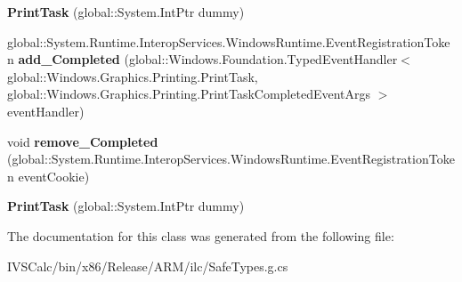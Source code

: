 \begin{DoxyCompactItemize}
\item 
\mbox{\label{class_windows_1_1_graphics_1_1_printing_1_1_print_task_a96a4278842a221de2a49e30404b19e84}} 
{\bfseries Print\+Task} (global\+::\+System.\+Int\+Ptr dummy)
\item 
\mbox{\label{class_windows_1_1_graphics_1_1_printing_1_1_print_task_a017b8b87861dd7ab498c21ff1123c0fe}} 
global\+::\+System.\+Runtime.\+Interop\+Services.\+Windows\+Runtime.\+Event\+Registration\+Token {\bfseries add\+\_\+\+Completed} (global\+::\+Windows.\+Foundation.\+Typed\+Event\+Handler$<$ global\+::\+Windows.\+Graphics.\+Printing.\+Print\+Task, global\+::\+Windows.\+Graphics.\+Printing.\+Print\+Task\+Completed\+Event\+Args $>$ event\+Handler)
\item 
\mbox{\label{class_windows_1_1_graphics_1_1_printing_1_1_print_task_af8b684280a1580c00be6053e72e7badb}} 
void {\bfseries remove\+\_\+\+Completed} (global\+::\+System.\+Runtime.\+Interop\+Services.\+Windows\+Runtime.\+Event\+Registration\+Token event\+Cookie)
\item 
\mbox{\label{class_windows_1_1_graphics_1_1_printing_1_1_print_task_a96a4278842a221de2a49e30404b19e84}} 
{\bfseries Print\+Task} (global\+::\+System.\+Int\+Ptr dummy)
\end{DoxyCompactItemize}


The documentation for this class was generated from the following file\+:\begin{DoxyCompactItemize}
\item 
I\+V\+S\+Calc/bin/x86/\+Release/\+A\+R\+M/ilc/Safe\+Types.\+g.\+cs\end{DoxyCompactItemize}
